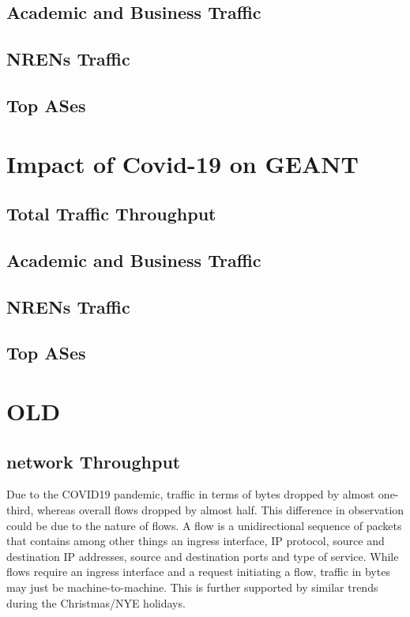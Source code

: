 \documentclass[10pt, journal, letterpaper]{IEEEtran}
\begin{document}
\subsection{Academic and Business Traffic}

\subsection{NRENs Traffic}

\subsection{Top ASes}





\section{Impact of Covid-19 on GEANT}

\subsection{Total Traffic Throughput}

\subsection{Academic and Business Traffic}

\subsection{NRENs Traffic}

\subsection{Top ASes}


\section{OLD}
\subsection{network Throughput}

Due to the COVID19 pandemic, traffic in terms of bytes dropped by almost one-third, whereas overall flows dropped by almost half. This difference in observation could be due to the nature of flows. A flow is a unidirectional sequence of packets that contains among other things an ingress interface, IP protocol, source and destination IP addresses, source and destination ports and type of service. While flows require an ingress interface and a request initiating a flow, traffic in bytes may just be machine-to-machine. This is further supported by similar trends during the Christmas/NYE holidays.
\end{document}

